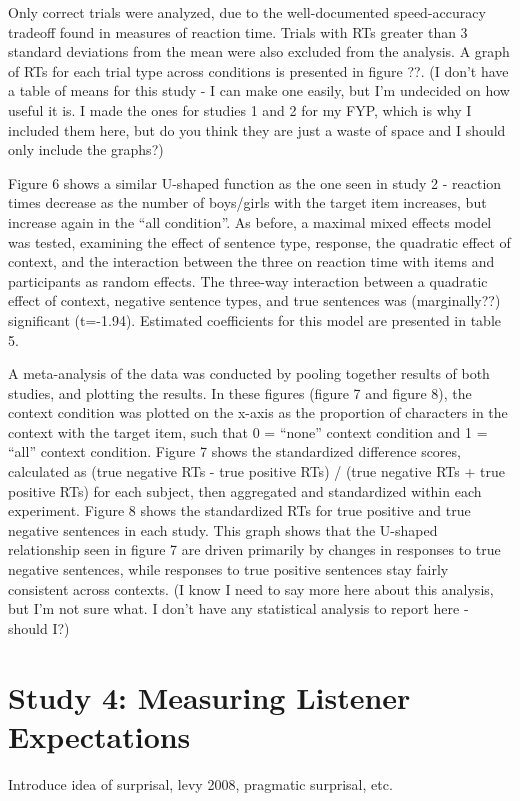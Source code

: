 \documentclass[10pt,letterpaper]{article}
\begin{document}
Only correct trials were analyzed, due to the well-documented speed-accuracy tradeoff found in measures of reaction time.  Trials with RTs greater than 3 standard deviations from the mean were also excluded from the analysis. A graph of RTs for each trial type across conditions is presented in figure ??.   (I don't have a table of means for this study - I can make one easily, but I'm undecided on how useful it is.  I made the ones for studies 1 and 2 for my FYP, which is why I included them here, but do you think they are just a waste of space and I should only include the graphs?)

Figure 6 shows a similar U-shaped function as the one seen in study 2 - reaction times decrease as the number of boys/girls with the target item increases, but increase again in the ``all condition''.  As before, a maximal mixed effects model was tested, examining the effect of sentence type, response, the quadratic effect of context, and the interaction between the three on reaction time with items and participants as random effects.  The three-way interaction between a quadratic effect of context, negative sentence types, and true sentences was (marginally??) significant (t=-1.94).  Estimated coefficients for this model are presented in table 5.  

A meta-analysis of the data was conducted by pooling together results of both studies, and plotting the results.  In these figures (figure 7 and figure 8), the context condition was plotted on the x-axis as the proportion of characters in the context with the target item, such that 0 = ``none'' context condition and 1 = ``all'' context condition.  Figure 7 shows the standardized difference scores, calculated as (true negative RTs - true positive RTs) / (true negative RTs + true positive RTs) for each subject, then aggregated and standardized within each experiment.  Figure 8 shows the standardized RTs for true positive and true negative sentences in each study.  This graph shows that the U-shaped relationship seen in figure 7 are driven primarily by changes in responses to true negative sentences, while responses to true positive sentences stay fairly consistent across contexts.  (I know I need to say more here about this analysis, but I'm not sure what.  I don't have any statistical analysis to report here - should I?)



\section{Study 4: Measuring Listener Expectations}
Introduce idea of surprisal, levy 2008, pragmatic surprisal, etc. 
\end{document}
